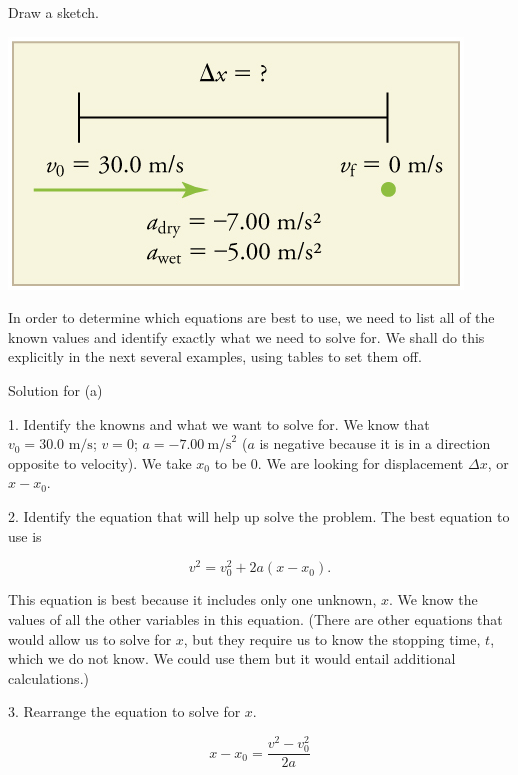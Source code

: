 \documentclass[
]{book}
\newenvironment{tinysection}{}{}
\begin{document}
Draw a sketch.

\includegraphics{images/Figure_02_04_02c.jpg}

In order to determine which equations are best to use, we need to list
all of the known values and identify exactly what we need to solve for.
We shall do this explicitly in the next several examples, using tables
to set them off.

\begin{tinysection}

{Solution for (a)}

\end{tinysection}

1. Identify the knowns and what we want to solve for. We know that
\({{v_{0} = \text{30}}\text{.}\text{0\ m/s}}{}\); \({v = \text{0}}{}\);
\({{a = {- 7}}\text{.}\text{00}\ \text{m/s}^{2}}{}\) (\(a\) is negative
because it is in a direction opposite to velocity). We take \(x_{0}{}\) to
be 0. We are looking for displacement \({\Delta x}{}\), or
\({x - x_{0}}{}\).

2. Identify the equation that will help up solve the problem. The best
equation to use is

\leavevmode\hypertarget{import-auto-id2180580}{}%
\[{{{v^{2} = {v_{0}^{2} + 2a}}\left( {x - x_{0}} \right)}.}{}\]

This equation is best because it includes only one unknown, \(x{}\). We
know the values of all the other variables in this equation. (There are
other equations that would allow us to solve for \(x{}\), but they require
us to know the stopping time, \(t{}\), which we do not know. We could use
them but it would entail additional calculations.)

3. Rearrange the equation to solve for \(x{}\).

\leavevmode\hypertarget{import-auto-id4179294}{}%
\[x - x_{0} = \frac{v^{2} - v_{0}^{2}}{2a}\]
\end{document}
